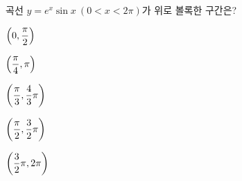 곡선 $y=e^x\sin x\ (0<x<2\pi)$가 위로 볼록한 구간은?
\begin{choices32}{\rule[-3ex]{0pt}{8ex}$\left(0{,}\mkern3mu\mathopen{}\dfrac{\pi}{2}\right)$}{\rule[-3ex]{0pt}{8ex}$\left(\dfrac{\pi}{4}{,}\mkern3mu\mathopen{}\pi\right)$}{\rule[-3ex]{0pt}{8ex}$\left(\dfrac{\pi}{3}{,}\mkern3mu\mathopen{}\dfrac{4}{3}\pi\right)$}{\rule[-3ex]{0pt}{8ex}$\left(\dfrac{\pi}{2}{,}\mkern3mu\mathopen{}\dfrac{3}{2}\pi\right)$}{\rule[-3ex]{0pt}{8ex}$\left(\dfrac{3}{2}\pi{,}\mkern3mu\mathopen{}2\pi\right)$}\end{choices32}
